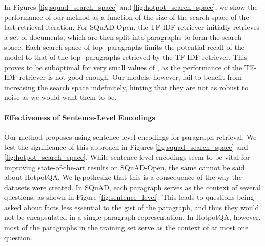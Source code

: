 \documentclass[11pt,a4paper,dvipsnames]{article}
\begin{document}
In Figures \ref{fig:squad_search_space} and \ref{fig:hotpot_search_space}, we show the performance of our method as a function of the size of the search space of the last retrieval iteration. For SQuAD-Open, the TF-IDF retriever initially retrieves a set of documents, which are then split into paragraphs to form the search space. Each search space of top- paragraphs limits the potential recall of the model to that of the top- paragraphs retrieved by the TF-IDF retriever. This proves to be suboptimal for very small values of , as the performance of the TF-IDF retriever is not good enough. Our models, however, fail to benefit from increasing the search space indefinitely, hinting that they are not as robust to noise as we would want them to be.

\paragraph{Effectiveness of Sentence-Level Encodings}
Our method proposes using sentence-level encodings for paragraph retrieval. We test the significance of this approach in Figures \ref{fig:squad_search_space} and \ref{fig:hotpot_search_space}. While sentence-level encodings seem to be vital for improving state-of-the-art results on SQuAD-Open, the same cannot be said about HotpotQA. We hypothesize that this is a consequence of the way the datasets were created. In SQuAD, each paragraph serves as the context of several questions, as shown in Figure \ref{fig:sentence_level}. This leads to questions being asked about facts less essential to the gist of the paragraph, and thus they would not be encapsulated in a single paragraph representation. In HotpotQA, however, most of the paragraphs in the training set serve as the context of at most one question.
\end{document}
